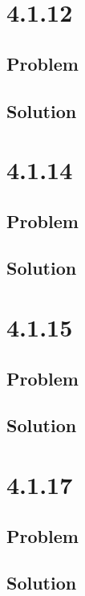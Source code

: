 \documentclass[12pt]{article}
\begin{document}
\section*{4.1.12}

\subsection*{Problem}

\subsection*{Solution}



\section*{4.1.14}

\subsection*{Problem}

\subsection*{Solution}



\section*{4.1.15}

\subsection*{Problem}

\subsection*{Solution}



\section*{4.1.17}

\subsection*{Problem}

\subsection*{Solution}
\end{document}
